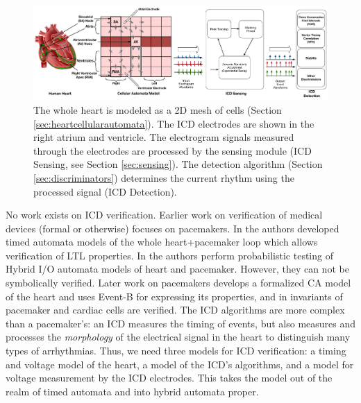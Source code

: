 \begin{figure}[t]
	\centering
	\vspace{-10pt}
	\includegraphics[scale=0.28]{figures/overviewFigure}
	\vspace{-10pt}
	\caption{\small The whole heart is modeled as a 2D mesh of cells (Section \ref{sec:heartcellularautomata}). The \ac{ICD} electrodes are shown in the right atrium and ventricle. The electrogram signals measured through the electrodes are processed by the sensing module (ICD Sensing, see Section \ref{sec:sensing}). The detection algorithm (Section \ref{sec:discriminators}) determines the current rhythm using the processed signal (ICD Detection).}
	\label{fig:overview}
	\vspace{-10pt}
\end{figure}
No work exists on \ac{ICD} verification. 
Earlier work on verification of medical devices (formal or otherwise) focuses on pacemakers.
In \cite{TACAS12} the authors developed timed automata models of the whole heart+pacemaker loop which allows verification of LTL properties.
In \cite{Chen14_Quantitative} the authors perform probabilistic testing of Hybrid I/O automata models of heart and pacemaker.
However, they can not be symbolically verified.
Later work on pacemakers \cite{Mery} develops a formalized \ac{CA} model of the heart and uses Event-B for expressing its properties, and in \cite{HuangFMFK14_VerifCardiacCells} invariants of pacemaker and cardiac cells are verified.
The \ac{ICD} algorithms are more complex than a pacemaker's: an \ac{ICD} measures the timing of events, but also measures and processes the \emph{morphology} of the electrical signal in the heart to distinguish many types of arrhythmias.
Thus, we need three models for \ac{ICD} verification: a timing and voltage model of the heart, a model of the \ac{ICD}'s algorithms, and a model for voltage measurement by the \ac{ICD} electrodes.
This takes the model out of the realm of timed automata and into hybrid automata proper.

